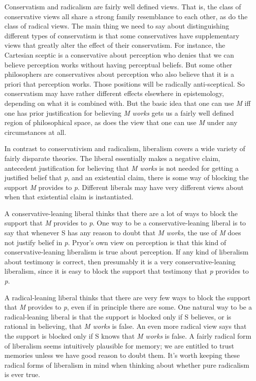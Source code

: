 \documentclass[
  10pt,
  letterpaper,
  twoside]{scrbook}
\begin{document}
Conservatism and radicalism are fairly well defined views. That is, the
class of conservative views all share a strong family resemblance to
each other, as do the class of radical views. The main thing we need to
say about distinguishing different types of conservatism is that some
conservatives have supplementary views that greatly alter the effect of
their conservatism. For instance, the Cartesian sceptic is a
conservative about perception who denies that we can believe perception
works without having perceptual beliefs. But some other philosophers are
conservatives about perception who also believe that it is a priori that
perception works. Those positions will be radically anti-sceptical. So
conservatism may have rather different effects elsewhere in
epistemology, depending on what it is combined with. But the basic idea
that one can use \emph{M} iff one has prior justification for believing
\emph{M works} gets us a fairly well defined region of philosophical
space, as does the view that one can use \emph{M} under any
circumstances at all.

In contrast to conservativism and radicalism, liberalism covers a wide
variety of fairly disparate theories. The liberal essentially makes a
negative claim, antecedent justification for believing that \emph{M
works} is not needed for getting a justified belief that \emph{p}, and
an existential claim, there is some way of blocking the support \emph{M}
provides to \emph{p}. Different liberals may have very different views
about when that existential claim is instantiated.

A conservative-leaning liberal thinks that there are a lot of ways to
block the support that \emph{M} provides to \emph{p}. One way to be a
conservative-leaning liberal is to say that whenever S has any reason to
doubt that \emph{M works}, the use of \emph{M} does not justify belief
in \emph{p}. Pryor's own view on perception is that this kind of
conservative-leaning liberalism is true about perception. If any kind of
liberalism about testimony is correct, then presumably it is a very
conservative-leaning liberalism, since it is easy to block the support
that testimony that \emph{p} provides to \emph{p}.

A radical-leaning liberal thinks that there are very few ways to block
the support that \emph{M} provides to \emph{p}, even if in principle
there are some. One natural way to be a radical-leaning liberal is that
the support is blocked only if S believes, or is rational in believing,
that \emph{M works} is false. An even more radical view says that the
support is blocked only if S knows that \emph{M works} is false. A
fairly radical form of liberalism seems intuitively plausible for
memory; we are entitled to trust memories unless we have good reason to
doubt them. It's worth keeping these radical forms of liberalism in mind
when thinking about whether pure radicalism is ever true.
\end{document}
